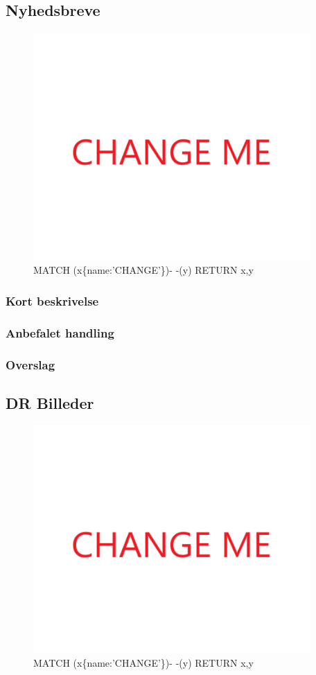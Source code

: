 \documentclass{article}
\begin{document}
\subsection{Nyhedsbreve}
\begin{figure}[h]
\includegraphics[width=300pt]{CHANGE.PNG}
\caption{MATCH (x\{name:'CHANGE'\})- -(y) RETURN x,y}
\end{figure}
\subsubsection{Kort beskrivelse}
\subsubsection{Anbefalet handling}
\subsubsection{Overslag}
\newpage{}
\clearpage
\subsection{DR Billeder}
\begin{figure}[h]
\includegraphics[width=300pt]{CHANGE.PNG}
\caption{MATCH (x\{name:'CHANGE'\})- -(y) RETURN x,y}
\end{figure}
\end{document}
